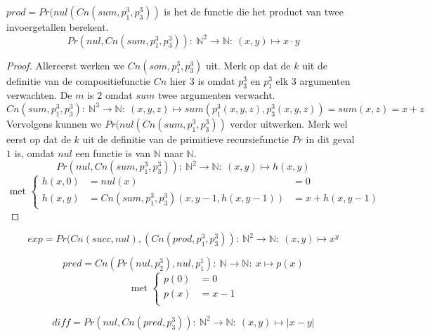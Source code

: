 \documentclass[main.tex]{subfiles}
\begin{document}
\begin{vb}
  $prod = Pr(nul(Cn(sum,p_{1}^{3},p_{3}^{3}))$ is het de functie die het product van twee invoergetallen berekent.
  \[ Pr(nul,Cn(sum,p_{1}^{3},p_{3}^{3})):\ \mathbb{N}^{2} \rightarrow \mathbb{N}:\ (x,y) \mapsto x\cdot y \]

  \begin{proof}
    Allereerst werken we $Cn(som,p_{1}^{3},p_{3}^{3})$ uit.
    Merk op dat de $k$ uit de definitie van de compositiefunctie $Cn$ hier $3$ is omdat $p_{3}^{3}$ en $p_{1}^{3}$ elk $3$ argumenten verwachten.
    De $m$ is $2$ omdat $sum$ twee argumenten verwacht.
    \[ Cn(sum,p_{1}^{3},p_{3}^{3}):\ \mathbb{N}^{3} \rightarrow \mathbb{N}:\ (x,y,z) \mapsto sum(p_{1}^{3}(x,y,z),p_{3}^{3}(x,y,z)) = sum(x,z) = x + z \]
    Vervolgens kunnen we $Pr(nul(Cn(sum,p_{1}^{3},p_{3}^{3}))$ verder uitwerken.
    Merk wel eerst op dat de $k$ uit de definitie van de primitieve recursiefunctie $Pr$ in dit geval $1$ is, omdat $nul$ een functie is van $\mathbb{N}$ naar $\mathbb{N}$.
    \[ Pr(nul,Cn(sum,p_{1}^{3},p_{3}^{3})):\ \mathbb{N}^{2} \rightarrow \mathbb{N}:\ (x,y) \mapsto h(x,y) \]
    \[
    \text{ met } 
    \left\{
      \begin{array}{rll}
        h(x,0) &= nul(x) &= 0\\
        h(x,y) &= Cn(sum,p_{1}^{3},p_{3}^{3})(x,y-1,h(x,y-1)) &= x + h(x,y-1)
      \end{array}
    \right.
    \]
  \end{proof}
\end{vb}

\begin{vb}
  \[ exp = Pr(Cn(succ,nul),(Cn(prod,p_{1}^{3},p_{3}^{3})):\ \mathbb{N}^{2}\rightarrow \mathbb{N}:\ (x,y) \mapsto x^{y} \]
\end{vb}


\begin{vb}
  \[ pred = Cn(Pr(nul,p_{2}^{3}),nul,p_{1}^{1}):\ \mathbb{N}\rightarrow \mathbb{N}:\ x \mapsto p(x) \]
  \[
  \text{ met }
  \left\{
    \begin{array}{rl}
      p(0) &= 0\\
      p(x) &= x-1\\
    \end{array}
  \right.
  \]
\end{vb}

\begin{vb}
  \[ diff = Pr(nul,Cn(pred,p_{3}^{3})):\ \mathbb{N}^{2} \rightarrow \mathbb{N}:\ (x,y) \mapsto |x-y| \]
\end{vb}
\end{document}
